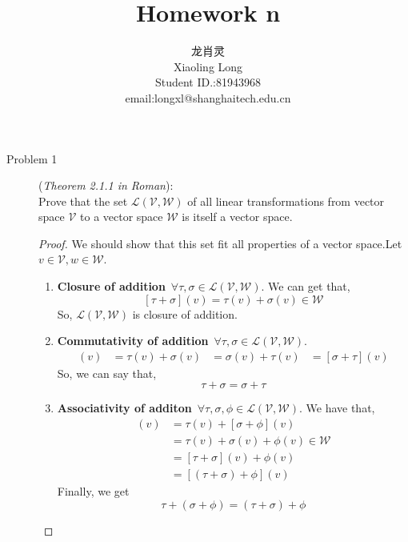 \documentclass[a4paper]{article}
\title{Homework n}
\author{龙肖灵 \\Xiaoling Long\\Student ID.:81943968\\email:longxl@shanghaitech.edu.cn}
\begin{document}
\maketitle

\begin{description}
\item[Problem 1](\textit{Theorem 2.1.1 in Roman}):\\
Prove that the set $\mathcal{L}(\mathcal{V},\mathcal{W})$ of all linear transformations from vector space $\mathcal{V}$ to a vector space $\mathcal{W}$ is itself a vector space.

\begin{proof}
  We should show that this set fit all properties of a vector space.Let $v \in \mathcal{V} , w \in \mathcal{W} $.
  \begin{enumerate}[ 1) ]
    \item \textbf{Closure of addition}\ $\forall \tau,\sigma \in \mathcal{L}\left(\mathcal{V},\mathcal{W}\right)$.
    We can get that,
      $$[\tau+\sigma](v)=\tau(v)+\sigma(v) \in \mathcal{W}$$
      So, $\mathcal{L}\left(\mathcal{V},\mathcal{W}\right)$ is closure of addition.
    \item \textbf{Commutativity of addition}\ $\forall \tau,\sigma \in \mathcal{L}\left(\mathcal{V},\mathcal{W}\right)$.
    \begin{align*}
      [\tau+\sigma](v)&=\tau(v)+\sigma(v)
      &=\sigma(v)+\tau(v)
      &=[\sigma+\tau](v)
    \end{align*}
    So, we can say that,$$\tau+\sigma=\sigma+\tau$$
    \item \textbf{Associativity of additon}\  $\forall \tau,\sigma,\phi \in \mathcal{L}\left(\mathcal{V},\mathcal{W}\right)$. We have that,
    \begin{align*}
      [\tau+(\sigma+\phi)](v)&=\tau(v)+[\sigma+\phi](v)\\
      &=\tau(v)+\sigma(v)+\phi(v) \in \mathcal{W}\\
      &=[\tau+\sigma](v)+\phi(v)\\
      &=[(\tau+\sigma)+\phi](v)
    \end{align*}
    Finally, we get $$\tau+(\sigma+\phi)=(\tau+\sigma)+\phi$$


\end{enumerate}
\end{proof}
\end{description}
\end{document}
